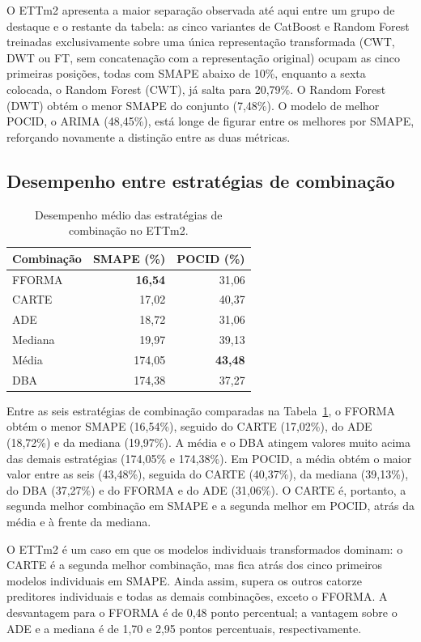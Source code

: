 O ETTm2 apresenta a maior separação observada até aqui entre um grupo de destaque e o restante da tabela: as cinco variantes de CatBoost e Random Forest treinadas exclusivamente sobre uma única representação transformada (CWT, DWT ou FT, sem concatenação com a representação original) ocupam as cinco primeiras posições, todas com SMAPE abaixo de 10\%, enquanto a sexta colocada, o Random Forest (CWT), já salta para 20,79\%. O Random Forest (DWT) obtém o menor SMAPE do conjunto (7,48\%). O modelo de melhor POCID, o ARIMA (48,45\%), está longe de figurar entre os melhores por SMAPE, reforçando novamente a distinção entre as duas métricas.

\subsection{Desempenho entre estratégias de combinação}

\begin{table}[H]
\centering
\caption{Desempenho médio das estratégias de combinação no ETTm2.}
\label{tab:ettm2-estaticas}
\begin{tabular}{@{}lrr@{}}
\toprule
\textbf{Combinação} & \textbf{SMAPE (\%)} & \textbf{POCID (\%)} \\
\midrule
FFORMA  & \textbf{16,54} & 31,06 \\
CARTE   & 17,02 & 40,37 \\
ADE     & 18,72 & 31,06 \\
Mediana & 19,97 & 39,13 \\
Média   & 174,05 & \textbf{43,48} \\
DBA     & 174,38 & 37,27 \\
\bottomrule
\end{tabular}
\end{table}

Entre as seis estratégias de combinação comparadas na Tabela~\ref{tab:ettm2-estaticas}, o FFORMA obtém o menor SMAPE (16,54\%), seguido do CARTE (17,02\%), do ADE (18,72\%) e da mediana (19,97\%). A média e o DBA atingem valores muito acima das demais estratégias (174,05\% e 174,38\%). Em POCID, a média obtém o maior valor entre as seis (43,48\%), seguida do CARTE (40,37\%), da mediana (39,13\%), do DBA (37,27\%) e do FFORMA e do ADE (31,06\%). O CARTE é, portanto, a segunda melhor combinação em SMAPE e a segunda melhor em POCID, atrás da média e à frente da mediana.

O ETTm2 é um caso em que os modelos individuais transformados dominam: o CARTE é a segunda melhor combinação, mas fica atrás dos cinco primeiros modelos individuais em SMAPE. Ainda assim, supera os outros catorze preditores individuais e todas as demais combinações, exceto o FFORMA. A desvantagem para o FFORMA é de 0,48 ponto percentual; a vantagem sobre o ADE e a mediana é de 1,70 e 2,95 pontos percentuais, respectivamente.


